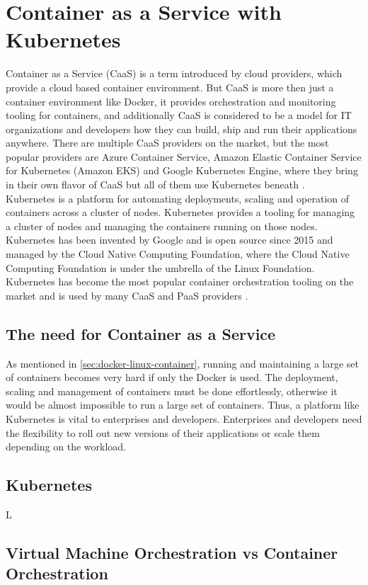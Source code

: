 \chapter{Container as a Service with Kubernetes}
\label{cha:caas}
Container as a Service (CaaS) is a term introduced by cloud providers, which provide a cloud based container environment. But CaaS is more then just a container environment like Docker, it provides orchestration and monitoring tooling for containers, and additionally CaaS is considered to be a model for IT organizations and developers how they can build, ship and run their applications anywhere. There are multiple CaaS providers on the market, but the most popular providers are Azure Container Service, Amazon Elastic Container Service for Kubernetes (Amazon EKS) and Google Kubernetes Engine, where they bring in their own flavor of CaaS but all of them use Kubernetes beneath  \cite{CNCFKubernetes2018, MicrosoftAzureAKS2018, AmazonWebServicesEKS2018, GoogleCloudKE2018}. \\

Kubernetes is a platform for automating deployments, scaling and operation of containers across a cluster of nodes. Kubernetes provides a tooling for managing a cluster of nodes and managing the containers running on those nodes. Kubernetes has been invented by Google and is open source since 2015 and managed by the Cloud Native Computing Foundation, where the Cloud Native Computing Foundation is under the umbrella of the Linux Foundation. Kubernetes has become the most popular container orchestration tooling on the market and is used by many CaaS and PaaS providers \cite{CNCF2018}.

\section{The need for Container as a Service}
\label{sec:caas-need-for-caas}
As mentioned in \vref{sec:docker-linux-container}, running and maintaining a large set of containers becomes very hard if only the Docker is used. The deployment, scaling and management of containers must be done effortlessly, otherwise it would be almost impossible to run a large set of containers. Thus, a platform like Kubernetes is vital to enterprises and developers. Enterprises and developers need the flexibility to roll out new versions of their applications or scale them depending on the workload. 

\section{Kubernetes}
\label{sec:caas-kubernetes}L

\section{Virtual Machine Orchestration vs Container Orchestration}
\label{sec:caas-vm-vs-container-orchestration}

